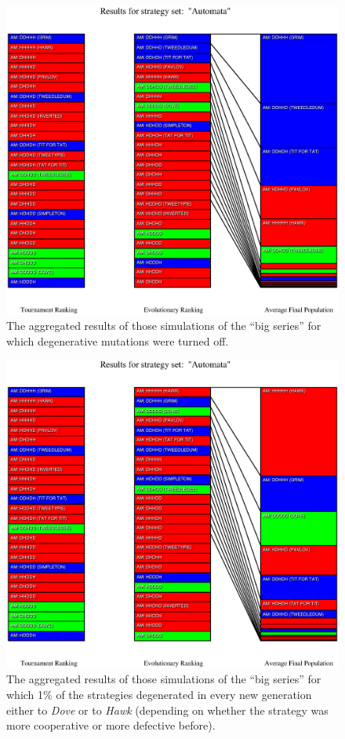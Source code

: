\begin{figure}
\begin{center}
\includegraphics[width=20cm]{tables/Automata_D0.000.eps}
\caption{\label{Automata_D0000} The aggregated results of those
simulations of the ``big series'' for which degenerative mutations were turned
off.}
\end{center}
\end{figure}

\begin{figure}
\begin{center}
\includegraphics[width=20cm]{tables/Automata_D0.010.eps}
\caption{\label{Automata_D0010} The aggregated results of those
simulations of the ``big series'' for which 1\% of the strategies degenerated
in every new generation either to {\em Dove} or to {\em Hawk} (depending on
whether the strategy was more cooperative or more defective before).}
\end{center}
\end{figure}

